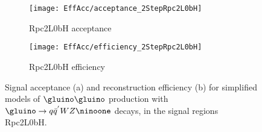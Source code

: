 \begin{figure}[ht]
\centering
\begin{subfigure}[t]{0.49\textwidth}\texttt{[image: EffAcc/acceptance\_2StepRpc2L0bH]}\caption{Rpc2L0bH acceptance}\label{fig:strategy.accRpc2L0bH}\end{subfigure}
\begin{subfigure}[t]{0.49\textwidth}\texttt{[image: EffAcc/efficiency\_2StepRpc2L0bH]}\caption{Rpc2L0bH efficiency}\label{fig:strategy.effRpc2L0bH}\end{subfigure}
\caption{Signal acceptance (a) and reconstruction efficiency (b) 
for simplified models of $\gluino\gluino$ production with $\gluino\to q\bar q^{'}WZ\ninoone$ decays, 
in the signal regions Rpc2L0bH.}
\end{figure}

